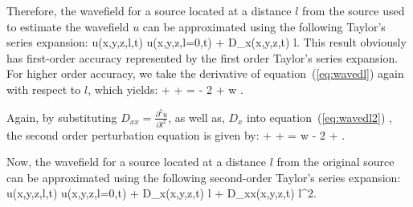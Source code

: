 Therefore, the wavefield for a source located at a distance $l$ from the source used to estimate the wavefield $u$ can be approximated
 using the following Taylor's series expansion:
\beqa
u(x,y,z,l,t) \approx u(x,y,z,l=0,t) + D_x(x,y,z,t) l.
\label{eq:Taylor1}
\eeqa
This result obviously has first-order accuracy represented by the first order Taylor's series expansion. For higher order accuracy, we take
the derivative of equation~(\ref{eq:wavedl}) again with respect to $l$, which yields:
\beqa
{}+
 +  =   
- 2   +
w  .
\label{eq:wavedl2}
\eeqa

Again, by substituting $D_{xx}=\frac{\partial^2 u}{\partial l^2}$, as well as, $D_x$ into  equation~(\ref{eq:wavedl2}) , 
 the
second order perturbation equation is given by:
\beqa
{}+
 +  = w   - 2   
+ .
\label{eq:wavedl2f}
\eeqa

Now, the wavefield for a source located at a distance $l$ from the original source  can be approximated
using the following second-order Taylor's series expansion:
\beqa
u(x,y,z,l,t) \approx  u(x,y,z,l=0,t) + D_x(x,y,z,t) l +  D_{xx}(x,y,z,t) l^2.
\label{eq:Taylor1}
\eeqa




